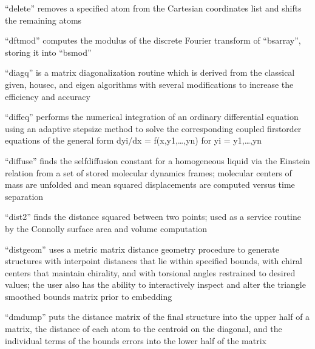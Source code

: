 \documentclass[letterpaper,11pt,english]{sphinxmanual}
\begin{document}

“delete” removes a specified atom from the Cartesian coordinates list and shifts the remaining atoms





“dftmod” computes the modulus of the discrete Fourier transform of “bsarray”, storing it into “bsmod”


“diagq” is a matrix diagonalization routine which is derived from the classical given, housec, and eigen algorithms with several modifications to increase the efficiency and accuracy


“diffeq” performs the numerical integration of an ordinary differential equation using an adaptive stepsize method to solve the corresponding coupled first\sphinxhyphen{}order equations of the general form dyi/dx = f(x,y1,…,yn) for yi = y1,…,yn


“diffuse” finds the self\sphinxhyphen{}diffusion constant for a homogeneous liquid via the Einstein relation from a set of stored molecular dynamics frames; molecular centers of mass are unfolded and mean squared displacements are computed versus time separation


“dist2” finds the distance squared between two points; used as a service routine by the Connolly surface area and volume computation


“distgeom” uses a metric matrix distance geometry procedure to generate structures with interpoint distances that lie within specified bounds, with chiral centers that maintain chirality, and with torsional angles restrained to desired values; the user also has the ability to interactively inspect and alter the triangle smoothed bounds matrix prior to embedding


“dmdump” puts the distance matrix of the final structure into the upper half of a matrix, the distance of each atom to the centroid on the diagonal, and the individual terms of the bounds errors into the lower half of the matrix
\end{document}

